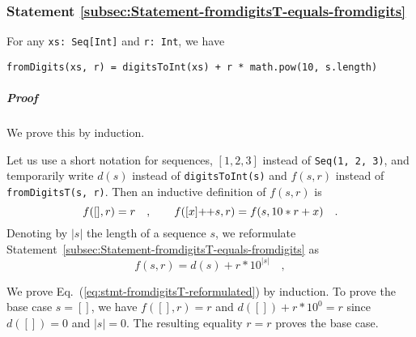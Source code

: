 \subsubsection{Statement \label{subsec:Statement-fromdigitsT-equals-fromdigits}\ref{subsec:Statement-fromdigitsT-equals-fromdigits}}

For any \lstinline!xs: Seq[Int]!
and \lstinline!r: Int!,
we have
\begin{lstlisting}
fromDigits(xs, r) = digitsToInt(xs) + r * math.pow(10, s.length)
\end{lstlisting}

\subparagraph{Proof}

We prove this by induction. %
\begin{comment}
It is quicker to write this proof in a mathematical notation instead
of the Scala code syntax.
\end{comment}
Let us use a short notation for sequences, $\left[1,2,3\right]$ instead
of \lstinline!Seq(1, 2, 3)!,
and temporarily write $d(s)$ instead of \lstinline!digitsToInt(s)!
and $f(s,r)$ instead of \lstinline!fromDigitsT(s, r)!.
Then an inductive definition of $f(s,r)$ is
\begin{equation}
f([],r)=r\quad,\quad\quad f([x]\negmedspace+\negthickspace+s,r)=f(s,10*r+x)\quad.\label{eq:stmt-fromdigitsT-expand-f}
\end{equation}
Denoting by $\left|s\right|$ the length of a sequence $s$, we reformulate
Statement~\ref{subsec:Statement-fromdigitsT-equals-fromdigits} as
\begin{equation}
f(s,r)=d(s)+r*10^{\left|s\right|}\quad,\label{eq:stmt-fromdigitsT-reformulated}
\end{equation}

We prove Eq.~(\ref{eq:stmt-fromdigitsT-reformulated}) by induction.
To prove the base case $s=\left[\right]$, we have $f(\left[\right],r)=r$
and $d(\left[\right])+r*10^{0}=r$ since $d(\left[\right])=0$ and
$\left|s\right|=0$. The resulting equality $r=r$ proves the base
case. 

